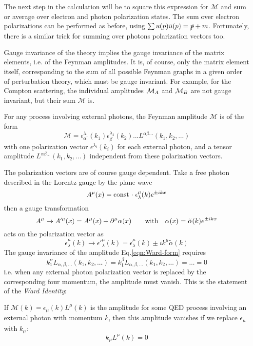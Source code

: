 \documentclass[TheoreticalPhy_ModB.tex]{subfiles}
\begin{document}
The next step in the calculation will be to square this expression for $\mathcal M$ and sum or average over electron and photon polarization states. The sum over electron polarizations can be performed as before, using $\sum u(p)\bar u(p)=\slashed p+m$. Fortunately, there is a similar trick for summing over photons polarization vectors too.

Gauge invariance of the theory implies the gauge invariance of the matrix elements, i.e. of the Feynman amplitudes. It is, of course, only the matrix element itself, corresponding to the sum of all possible Feynman graphs in a given order of perturbation theory, which must be gauge invariant. For example, for the Compton scattering, the individual amplitudes $\mathcal{M}_A$ and $\mathcal{M}_B$ are not gauge invariant, but their sum $\mathcal M$ is.

For any process involving external photons, the Feynman amplitude $\mathcal M$ is of the form
\begin{equation}\label{eqn:Ward-form}
\mathcal M=\epsilon_\alpha^{\lambda_1}(k_1)\epsilon_\beta^{\lambda_2}(k_2)\dots L^{\alpha\beta\dots}(k_1,k_2,\dots)
\end{equation}
with one polarization vector $\epsilon^{\lambda_i}(k_i)$ for each external photon, and a tensor amplitude $L^{\alpha\beta\dots}(k_1,k_2,\dots)$ independent from these polarization vectors.

The polarization vectors are of course gauge dependent. Take a free photon described in the Lorentz gauge by the plane wave
\[A^\mu(x)=\textup{const}\,\cdot\epsilon_\lambda^\mu(k)e^{\pm ikx}\]
then a gauge transformation
\[A^\mu\rightarrow A'^\mu(x)=A^\mu(x)+\partial^\mu\alpha(x)\qquad\textup{with}\quad \alpha(x)=\tilde\alpha(k)e^{\pm ikx}\]
acts on the polarization vector as
\[\epsilon_\lambda^\mu(k)\rightarrow{\epsilon'}_\lambda^{\mu}(k)=\epsilon_\lambda^\mu(k)\pm ik^\mu\tilde\alpha(k)\]
The gauge invariance of the amplitude Eq.\eqref{eqn:Ward-form} requires
\[k^\alpha_1L_{\alpha,\beta,\dots}(k_1,k_2,\dots)=k^\beta_1L_{\alpha,\beta,\dots}(k_1,k_2,\dots)=\dots=0\]
i.e. when any external photon polarization vector is replaced by the corresponding four momentum, the amplitude must vanish. This is the statement of the \emph{Ward Identity}:

\begin{mdframed}[style=mybox]
If $\mathcal M(k)=\epsilon_\mu(k)L^\mu(k)$ is the amplitude for some QED process involving an external photon with momentum $k$, then this amplitude vanishes if we replace $\epsilon_\mu$ with $k_\mu$:
\[k_\mu L^\mu(k)=0\]
\end{mdframed}
\end{document}
